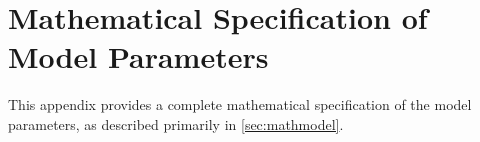 \section{Mathematical Specification of Model Parameters}
\label{app:model_param}

This appendix provides a complete mathematical specification of the
model parameters, as described primarily in
\ref{sec:mathmodel}.